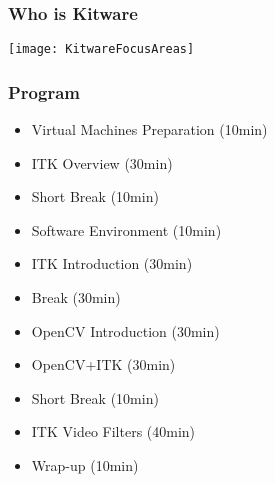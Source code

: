 \documentclass[18pt]{beamer}
\begin{document}
\begin{frame}
\frametitle{Who is Kitware}
\begin{center}
\texttt{[image: KitwareFocusAreas]}
\end{center}
\end{frame}

\begin{frame}
\frametitle{Program}
\begin{itemize}
\item Virtual Machines Preparation (10min)
\pause
\item ITK Overview (30min)
\pause
\item Short Break (10min)
\pause
\item Software Environment (10min)
\pause
\item ITK Introduction (30min)
\pause
\item Break (30min)
\pause
\item OpenCV Introduction (30min)
\pause
\item OpenCV+ITK (30min)
\pause
\item Short Break (10min)
\pause
\item ITK Video Filters (40min)
\pause
\item Wrap-up (10min)
\end{itemize}
\end{frame}















\end{document}
